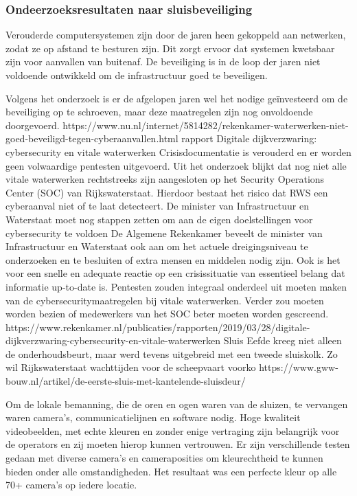 \subsubsection{Ondeerzoeksresultaten naar sluisbeveiliging}



Verouderde computersystemen zijn door de jaren heen gekoppeld aan netwerken, zodat ze op afstand te besturen zijn. Dit zorgt ervoor dat systemen kwetsbaar zijn voor aanvallen van buitenaf. De beveiliging is in de loop der jaren niet voldoende ontwikkeld om de infrastructuur goed te beveiligen.

Volgens het onderzoek is er de afgelopen jaren wel het nodige geïnvesteerd om de beveiliging op te schroeven, maar deze maatregelen zijn nog onvoldoende doorgevoerd.
https://www.nu.nl/internet/5814282/rekenkamer-waterwerken-niet-goed-beveiligd-tegen-cyberaanvallen.html
rapport Digitale dijkverzwaring: cybersecurity en vitale waterwerken 
Crisisdocumentatie is verouderd en er worden geen volwaardige pentesten uitgevoerd. Uit het onderzoek blijkt dat nog niet alle vitale waterwerken rechtstreeks zijn aangesloten op het Security Operations Center (SOC) van Rijkswaterstaat. Hierdoor bestaat het risico dat RWS een cyberaanval niet of te laat detecteert. De minister van Infrastructuur en Waterstaat moet nog stappen zetten om aan de eigen doelstellingen voor cybersecurity te voldoen
De Algemene Rekenkamer beveelt de minister van Infrastructuur en Waterstaat ook aan om het actuele dreigingsniveau te onderzoeken en te besluiten of extra mensen en middelen nodig zijn. Ook is het voor een snelle en adequate reactie op een crisissituatie van essentieel belang dat informatie up-to-date is. Pentesten zouden integraal onderdeel uit moeten maken van de cybersecuritymaatregelen bij vitale waterwerken. Verder zou moeten worden bezien of medewerkers van het SOC beter moeten worden gescreend.
https://www.rekenkamer.nl/publicaties/rapporten/2019/03/28/digitale-dijkverzwaring-cybersecurity-en-vitale-waterwerken
Sluis Eefde kreeg niet alleen de onderhoudsbeurt, maar werd tevens uitgebreid met een tweede sluiskolk. Zo wil Rijkswaterstaat wachttijden voor de scheepvaart voorko
https://www.gww-bouw.nl/artikel/de-eerste-sluis-met-kantelende-sluisdeur/

Om de lokale bemanning, die de oren en ogen waren van de sluizen, te vervangen waren camera’s, communicatielijnen en software nodig. Hoge kwaliteit videobeelden, met echte kleuren en zonder enige vertraging zijn belangrijk voor de operators en zij moeten hierop kunnen vertrouwen. Er zijn verschillende testen gedaan met diverse camera’s en cameraposities om kleurechtheid te kunnen bieden onder alle omstandigheden. Het resultaat was een perfecte kleur op alle 70+ camera’s op iedere locatie.

